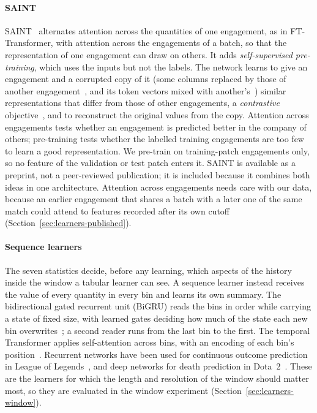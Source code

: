 \paragraph{SAINT}
SAINT~\cite{somepalli2021saint} alternates attention across the quantities of one engagement, as in
FT-Transformer, with attention across the engagements of a batch, so that the representation of one
engagement can draw on others. It adds \emph{self-supervised pre-training}, which uses the inputs but not
the labels. The network learns to give an engagement and a corrupted copy of it (some columns replaced by
those of another engagement~\cite{yun2019cutmix}, and its token vectors mixed with another's~\cite{zhang2018mixup})
similar representations that differ from those of other engagements, a \emph{contrastive}
objective~\cite{chen2020simple}, and to reconstruct the original values from the copy. Attention across
engagements tests whether an engagement is predicted better in the company of others; pre-training tests
whether the labelled training engagements are too few to learn a good representation. We pre-train on
training-patch engagements only, so no feature of the validation or test patch enters it. SAINT is
available as a preprint, not a peer-reviewed publication; it is included because it combines both ideas
in one architecture. Attention across engagements needs care with our data, because an earlier engagement
that shares a batch with a later one of the same match could attend to features recorded after its own
cutoff (Section~\ref{sec:learners-published}).

\paragraph{Sequence learners}
The seven statistics decide, before any learning, which aspects of the history inside the window a
tabular learner can see. A sequence learner instead receives the value of every quantity in every bin and
learns its own summary. The bidirectional gated recurrent unit (BiGRU) reads the bins in order while
carrying a state of fixed size, with learned gates deciding how much of the state each new bin
overwrites~\cite{cho2014learning}; a second reader runs from the last bin to the first. The temporal
Transformer applies self-attention across bins, with an encoding of each bin's
position~\cite{vaswani2017attention}. Recurrent networks have been used for continuous outcome prediction
in League of Legends~\cite{silva2018continuous}, and deep networks for death prediction in
Dota~2~\cite{katona2019time}. These are the learners for which the length and resolution of the window
should matter most, so they are evaluated in the window experiment (Section~\ref{sec:learners-window}).

